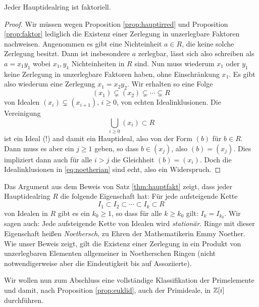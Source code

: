 \documentclass{book}
\begin{document}
\begin{thm}
    \label{thm:hauptfakt}
    Jeder Hauptidealring ist faktoriell.
\end{thm}
\begin{proof}
    Wir müssen wegen Proposition \ref{prop:hauptirred} und Proposition
    \ref{prop:faktor} lediglich die Existenz einer Zerlegung in unzerlegbare
    Faktoren nachweisen. Angenommen es gibt eine Nichteinheit $a \in R$, die
    keine solche Zerlegung besitzt. Dann ist insbesondere $a$ zerlegbar, lässt
    sich also schreiben als $a = x_1 y_1$ wobei $x_1,y_1$ Nichteinheiten in $R$
    sind. Nun muss wiederum $x_1$ oder $y_1$ keine Zerlegung in unzerlegbare
    Faktoren haben, ohne Einschränkung $x_1$. Es gibt also wiederum eine
    Zerlegung $x_1 = x_2 y _2$. Wir erhalten so eine Folge
    \begin{equation}
        \label{eq:noetherian}
        (x_1) \subsetneq (x_2) \subsetneq \cdots \subsetneq R
    \end{equation}
    von Idealen $(x_i) \subsetneq (x_{i+1})$, $i \ge 0$, von echten Idealinklusionen. Die Vereinigung 
    \[
        \bigcup_{i \ge 0} (x_i)  \subset R
    \]
    ist ein Ideal (!) and damit ein Hauptideal, also von der Form $(b)$ für $b \in
    R$. Dann muss es aber ein $j \ge 1$ geben, so dass $b \in (x_j)$, also $(b)
    = (x_j)$. Dies impliziert dann auch für alle $i >j$ die Gleichheit
    $(b) = (x_i)$. Doch die Idealinklusionen in \eqref{eq:noetherian} sind
    echt, also ein Widerspruch.
\end{proof}

\begin{rem}
    \label{rem:noether}
    Das Argument aus dem Beweis von Satz \ref{thm:hauptfakt} zeigt,
    dass jeder Hauptidealring $R$ die folgende Eigenschaft hat:
    Für jede aufsteigende Kette
    \[
        I_1 \subset I_2 \subset \cdots \subset I_k \subset  R
    \]
    von Idealen in $R$ gibt es ein $k_0 \ge 1$, so dass für alle $k \ge k_0$
    gilt: $I_k = I_{k_0}$. Wir sagen auch: Jede aufsteigende Kette von Idealen
    wird \emph{stationär}. Ringe mit dieser Eigenschaft heißen
    \emph{Noethersch}, zu Ehren der Mathematikerin Emmy Noether. Wie unser
    Beweis zeigt, gilt die Existenz einer Zerlegung in ein Produkt von unzerlegbaren
    Elementen allgemeiner in Noetherschen Ringen (nicht notwendigerweise aber
    die Eindeutigkeit bis auf Assoziierte). 
\end{rem}

Wir wollen nun zum Abschluss eine vollständige Klassifikation der Primelemente
und damit, nach Proposition \ref{prop:euklid}, auch der Primideale, in $\mathbb{Z}[i]$
durchführen. 
\end{document}
